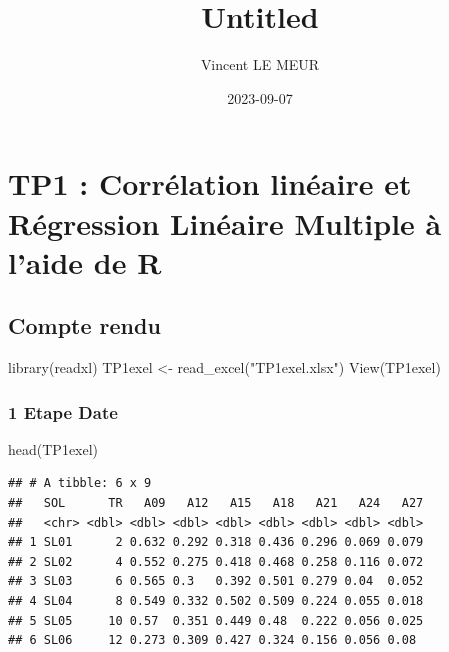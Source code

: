 \documentclass[
]{article}
\title{Untitled}
\author{Vincent LE MEUR}
\date{2023-09-07}
\newenvironment{Shaded}{\begin{snugshade}}{\end{snugshade}}
\newcommand{\FunctionTok}[1]{\textcolor[rgb]{0.00,0.00,0.00}{#1}}
\newcommand{\NormalTok}[1]{#1}
\newcommand{\OtherTok}[1]{\textcolor[rgb]{0.56,0.35,0.01}{#1}}
\newcommand{\StringTok}[1]{\textcolor[rgb]{0.31,0.60,0.02}{#1}}
\begin{document}
\maketitle

\hypertarget{tp1-corruxe9lation-linuxe9aire-et-ruxe9gression-linuxe9aire-multiple-uxe0-laide-de-r}{%
\section{TP1 : Corrélation linéaire et Régression Linéaire Multiple à
l'aide de
R}\label{tp1-corruxe9lation-linuxe9aire-et-ruxe9gression-linuxe9aire-multiple-uxe0-laide-de-r}}

\hypertarget{compte-rendu}{%
\subsection{Compte rendu}\label{compte-rendu}}

\begin{Shaded}
\begin{Highlighting}[]
\FunctionTok{library}\NormalTok{(readxl)}
\NormalTok{TP1exel }\OtherTok{\textless{}{-}} \FunctionTok{read\_excel}\NormalTok{(}\StringTok{"TP1exel.xlsx"}\NormalTok{)}
\FunctionTok{View}\NormalTok{(TP1exel)}
\end{Highlighting}
\end{Shaded}

\hypertarget{etape-date}{%
\subsubsection{1 Etape Date}\label{etape-date}}

\begin{Shaded}
\begin{Highlighting}[]
\FunctionTok{head}\NormalTok{(TP1exel)}
\end{Highlighting}
\end{Shaded}

\begin{verbatim}
## # A tibble: 6 x 9
##   SOL      TR   A09   A12   A15   A18   A21   A24   A27
##   <chr> <dbl> <dbl> <dbl> <dbl> <dbl> <dbl> <dbl> <dbl>
## 1 SL01      2 0.632 0.292 0.318 0.436 0.296 0.069 0.079
## 2 SL02      4 0.552 0.275 0.418 0.468 0.258 0.116 0.072
## 3 SL03      6 0.565 0.3   0.392 0.501 0.279 0.04  0.052
## 4 SL04      8 0.549 0.332 0.502 0.509 0.224 0.055 0.018
## 5 SL05     10 0.57  0.351 0.449 0.48  0.222 0.056 0.025
## 6 SL06     12 0.273 0.309 0.427 0.324 0.156 0.056 0.08
\end{verbatim}
\end{document}
